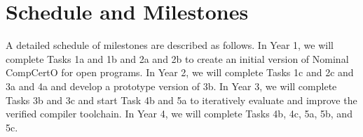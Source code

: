 \section{Schedule and Milestones}

A detailed schedule of milestones are described as follows. In Year 1, 
we will complete Tasks 1a and 1b and 2a and 2b to
create an initial version of Nominal CompCertO for open programs.
In Year 2, we will complete Tasks 1c and 2c and 3a and 4a and
develop a prototype version of 3b. In Year 3, 
we will complete Tasks 3b and 3c and start Task 4b and 5a to
iteratively evaluate and improve the verified compiler toolchain.
In Year 4, we will complete Tasks 4b, 4c, 5a, 5b, and 5c.


